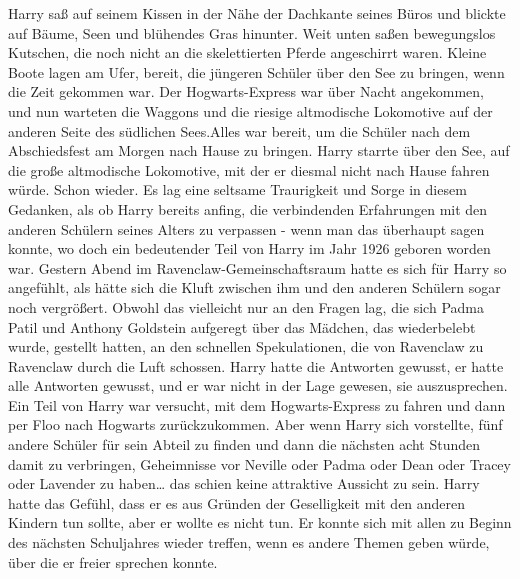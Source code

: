 {Harry saß auf seinem Kissen in der Nähe der Dachkante seines Büros und blickte auf Bäume, Seen und blühendes Gras hinunter. Weit unten saßen bewegungslos Kutschen, die noch nicht an die skelettierten Pferde angeschirrt waren. Kleine Boote lagen am Ufer, bereit, die jüngeren Schüler über den See zu bringen, wenn die Zeit gekommen war. Der Hogwarts-Express war über Nacht angekommen, und nun warteten die Waggons und die riesige altmodische Lokomotive auf der anderen Seite des südlichen Sees.Alles war bereit, um die Schüler nach dem Abschiedsfest am Morgen nach Hause zu bringen. Harry starrte über den See, auf die große altmodische Lokomotive, mit der er diesmal nicht nach Hause fahren würde. Schon wieder. Es lag eine seltsame Traurigkeit und Sorge in diesem Gedanken, als ob Harry bereits anfing, die verbindenden Erfahrungen mit den anderen Schülern seines Alters zu verpassen - wenn man das überhaupt sagen konnte, wo doch ein bedeutender Teil von Harry im Jahr 1926 geboren worden war. Gestern Abend im Ravenclaw-Gemeinschaftsraum hatte es sich für Harry so angefühlt, als hätte sich die Kluft zwischen ihm und den anderen Schülern sogar noch vergrößert. Obwohl das vielleicht nur an den Fragen lag, die sich Padma Patil und Anthony Goldstein aufgeregt über das Mädchen, das wiederbelebt wurde, gestellt hatten, an den schnellen Spekulationen, die von Ravenclaw zu Ravenclaw durch die Luft schossen. Harry hatte die Antworten gewusst, er hatte alle Antworten gewusst, und er war nicht in der Lage gewesen, sie auszusprechen. Ein Teil von Harry war versucht, mit dem Hogwarts-Express zu fahren und dann per Floo nach Hogwarts zurückzukommen. Aber wenn Harry sich vorstellte, fünf andere Schüler für sein Abteil zu finden und dann die nächsten acht Stunden damit zu verbringen, Geheimnisse vor Neville oder Padma oder Dean oder Tracey oder Lavender zu haben… das schien keine attraktive Aussicht zu sein. Harry hatte das Gefühl, dass er es aus Gründen der Geselligkeit mit den anderen Kindern tun sollte, aber er wollte es nicht tun. Er konnte sich mit allen zu Beginn des nächsten Schuljahres wieder treffen, wenn es andere Themen geben würde, über die er freier sprechen konnte.

}
